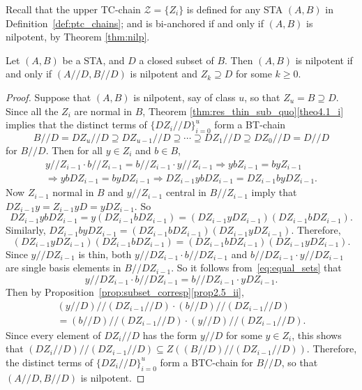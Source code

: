 Recall that the upper TC-chain $\mathcal{Z} = \{Z_i\}$ is
defined for any STA $(A, B)$ in Definition~\ref{def:ptc_chains}; and is
bi-anchored if and only if $(A, B)$ is nilpotent, by Theorem
\ref{thm:nilp}.
 
\begin{thm}
\label{thm:quotient_nilp}
Let $(A, B)$ be a STA, and $D$ a closed subset of $B$. Then $(A,
B)$ is nilpotent if and only if $(A//D, B//D)$ is nilpotent and $Z_k
\supseteq D$ for some $k \geq 0$.
\end{thm}

\begin{proof}
Suppose that $(A, B)$ is nilpotent, say of class $u$, so that $Z_u = B
\supseteq D$. Since all the $Z_i$ are normal in $B$, Theorem 
\ref{thm:res_thin_sub_quo}\ref{theo4.1_i} implies that the distinct terms of
$\{DZ_i//D\}_{i=0}^u$
form a BT-chain
\[
B//D = DZ_u//D \supseteq DZ_{u-1}//D \supseteq \cdots \supseteq
DZ_1//D \supseteq DZ_0//D = D//D
\]
for $B//D$. Then for all $y \in Z_i$ and $b \in B$,
\begin{multline*}
y//Z_{i-1}\cdot b//Z_{i-1} = b//Z_{i-1}\cdot y//Z_{i-1} \Rightarrow
 ybZ_{i-1} = byZ_{i-1}
\\
\Rightarrow ybDZ_{i-1} = byDZ_{i-1}
 \Rightarrow DZ_{i-1}ybDZ_{i-1} = DZ_{i-1}byDZ_{i-1}.
\end{multline*} 
Now $Z_{i-1}$ normal in $B$ and $y//Z_{i-1}$ central in $B//Z_{i-1}$ imply
that $DZ_{i-1}y = Z_{i-1}yD = yDZ_{i-1}$. So
\[
DZ_{i-1}ybDZ_{i-1} = y(DZ_{i-1}bDZ_{i-1}) = 
(DZ_{i-1}yDZ_{i-1})(DZ_{i-1}bDZ_{i-1}).
\]
Similarly, $DZ_{i-1}byDZ_{i-1} = (DZ_{i-1}bDZ_{i-1})(DZ_{i-1}yDZ_{i-1})$.
Therefore,
\begin{equation} 
\label{eq:equal_sets} 
(DZ_{i-1}yDZ_{i-1})(DZ_{i-1}bDZ_{i-1}) = 
(DZ_{i-1}bDZ_{i-1})(DZ_{i-1}yDZ_{i-1}).
\end{equation}
Since $y//DZ_{i-1}$ is thin, both $y//DZ_{i-1}\cdot b//DZ_{i-1}$ and
$b//DZ_{i-1}\cdot y//DZ_{i-1}$ are single basis elements in
$B//DZ_{i-1}$. So it follows from~\eqref{eq:equal_sets} that
\[
y//DZ_{i-1}\cdot b//DZ_{i-1} = b//DZ_{i-1}\cdot yDZ_{i-1}.
\] 
Then by Proposition~\ref{prop:subset_corresp}\ref{prop2.5_ii}, 
\begin{multline*}
(y//D)//(DZ_{i-1}//D)\cdot (b//D)//(DZ_{i-1}//D) 
\\
= (b//D)//(DZ_{i-1}//D)\cdot (y//D)//(DZ_{i-1}//D).
\end{multline*}
Since every element of $DZ_{i}//D$ has the form $y//D$ for some $y \in
Z_i$, this shows that $(DZ_i//D)//(DZ_{i-1}//D) \subseteq Z((B//D)//(DZ_{i-1}//D))$.
Therefore, the distinct terms of $\{DZ_i//D\}_{i=0}^u$ form a BTC-chain
for $B//D$, so that $(A//D, B//D)$ is nilpotent.


\end{proof}
